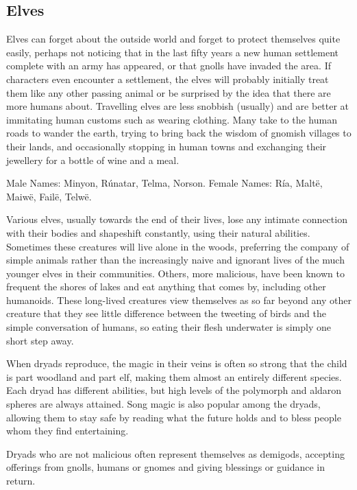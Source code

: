 \subsection{Elves}

Elves can forget about the outside world and forget to protect themselves quite easily, perhaps not noticing that in the last fifty years a new human settlement complete with an army has appeared, or that gnolls have invaded the area.  If characters even encounter a settlement, the elves will probably initially treat them like any other passing animal or be surprised by the idea that there are more humans about.  Travelling elves are less snobbish (usually) and are better at immitating human customs such as wearing clothing.  Many take to the human roads to wander the earth, trying to bring back the wisdom of gnomish villages to their lands, and occasionally stopping in human towns and exchanging their jewellery for a bottle of wine and a meal.

Male Names: Minyon, R\'{u}natar, Telma, Norson.  Female Names: R\'{i}a, Malt\"{e}, Maiw\"{e}, Fail\"{e}, Telw\"{e}.

\label{dryad}
\dryad

Various elves, usually towards the end of their lives, lose any intimate connection with their bodies and shapeshift constantly, using their natural abilities.  Sometimes these creatures will live alone in the woods, preferring the company of simple animals rather than the increasingly naive and ignorant lives of the much younger elves in their communities.  Others, more malicious, have been known to frequent the shores of lakes and eat anything that comes by, including other humanoids.  These long-lived creatures view themselves as so far beyond any other creature that they see little difference between the tweeting of birds and the simple conversation of humans, so eating their flesh underwater is simply one short step away.

When dryads reproduce, the magic in their veins is often so strong that the child is part woodland and part elf, making them almost an entirely different species.  Each dryad has different abilities, but high levels of the polymorph and aldaron spheres are always attained.  Song magic is also popular among the dryads, allowing them to stay safe by reading what the future holds and to bless people whom they find entertaining.

Dryads who are not malicious often represent themselves as demigods, accepting offerings from gnolls, humans or gnomes and giving blessings or guidance in return.

